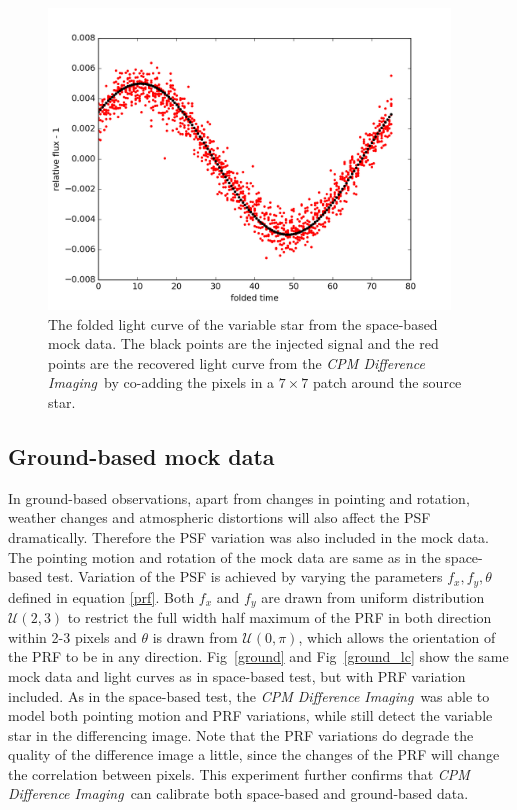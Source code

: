 \documentclass[12pt, preprint]{aastex}
\newcommand{\project}[1]{\textsl{#1}}
\newcommand{\cpmdiff}{\project{CPM Difference Imaging}}
\begin{document}
\begin{figure}[p]
\begin{center}
\includegraphics[width=0.95\textwidth]{f2a}
\end{center}
\caption{
\label{space_lc}
 The folded light curve of the variable star from the space-based mock data.
 The black points are the injected signal and the red points are the recovered light curve from the \cpmdiff\ by co-adding the pixels in a $7\times 7$ patch around the source star.
}
\end{figure}

\subsection{Ground-based mock data}
In ground-based observations, apart from changes in pointing and rotation, weather changes and atmospheric distortions will also affect the PSF dramatically. 
Therefore the PSF variation was also included in the mock data. 
The pointing motion and rotation of the mock data are same as in the space-based test.
Variation of the PSF is achieved by varying the parameters $f_x, f_y, \theta$ defined in equation \ref{prf}.
Both $f_x$ and $f_y$ are drawn from uniform distribution ${\mathcal {U}}(2,3)$ to restrict the full width half maximum of the PRF in both direction within 2-3 pixels and $\theta$ is drawn from ${\mathcal {U}}(0,\pi)$, which allows the orientation of the PRF to be in any direction.
Fig~\ref{ground} and Fig~\ref{ground_lc} show the same mock data and light curves as in space-based test, but with PRF variation included.  
As in the space-based test, the \cpmdiff\ was able to model both pointing motion and PRF variations, while still detect the variable star in the differencing image.
Note that the PRF variations do degrade the quality of the difference image a little, since the changes of the PRF will change the correlation between pixels.
This experiment further confirms that \cpmdiff\ can calibrate both space-based and ground-based data.
\end{document}
